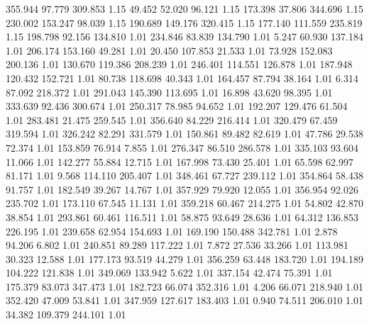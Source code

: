  355.944   97.779  309.853         1.15
  49.452   52.020   96.121         1.15
 173.398   37.806  344.696         1.15
 230.002  153.247   98.039         1.15
 190.689  149.176  320.415         1.15
 177.140  111.559  235.819         1.15
 198.798   92.156  134.810         1.01
 234.846   83.839  134.790         1.01
   5.247   60.930  137.184         1.01
 206.174  153.160   49.281         1.01
  20.450  107.853   21.533         1.01
  73.928  152.083  200.136         1.01
 130.670  119.386  208.239         1.01
 246.401  114.551  126.878         1.01
 187.948  120.432  152.721         1.01
  80.738  118.698   40.343         1.01
 164.457   87.794   38.164         1.01
   6.314   87.092  218.372         1.01
 291.043  145.390  113.695         1.01
  16.898   43.620   98.395         1.01
 333.639   92.436  300.674         1.01
 250.317   78.985   94.652         1.01
 192.207  129.476   61.504         1.01
 283.481   21.475  259.545         1.01
 356.640   84.229  216.414         1.01
 320.479   67.459  319.594         1.01
 326.242   82.291  331.579         1.01
 150.861   89.482   82.619         1.01
  47.786   29.538   72.374         1.01
 153.859   76.914    7.855         1.01
 276.347   86.510  286.578         1.01
 335.103   93.604   11.066         1.01
 142.277   55.884   12.715         1.01
 167.998   73.430   25.401         1.01
  65.598   62.997   81.171         1.01
   9.568  114.110  205.407         1.01
 348.461   67.727  239.112         1.01
 354.864   58.438   91.757         1.01
 182.549   39.267   14.767         1.01
 357.929   79.920   12.055         1.01
 356.954   92.026  235.702         1.01
 173.110   67.545   11.131         1.01
 359.218   60.467  214.275         1.01
  54.802   42.870   38.854         1.01
 293.861   60.461  116.511         1.01
  58.875   93.649   28.636         1.01
  64.312  136.853  226.195         1.01
 239.658   62.954  154.693         1.01
 169.190  150.488  342.781         1.01
   2.878   94.206    6.802         1.01
 240.851   89.289  117.222         1.01
   7.872   27.536   33.266         1.01
 113.981   30.323   12.588         1.01
 177.173   93.519   44.279         1.01
 356.259   63.448  183.720         1.01
 194.189  104.222  121.838         1.01
 349.069  133.942    5.622         1.01
 337.154   42.474   75.391         1.01
 175.379   83.073  347.473         1.01
 182.723   66.074  352.316         1.01
   4.206   66.071  218.940         1.01
 352.420   47.009   53.841         1.01
 347.959  127.617  183.403         1.01
   0.940   74.511  206.010         1.01
  34.382  109.379  244.101         1.01
